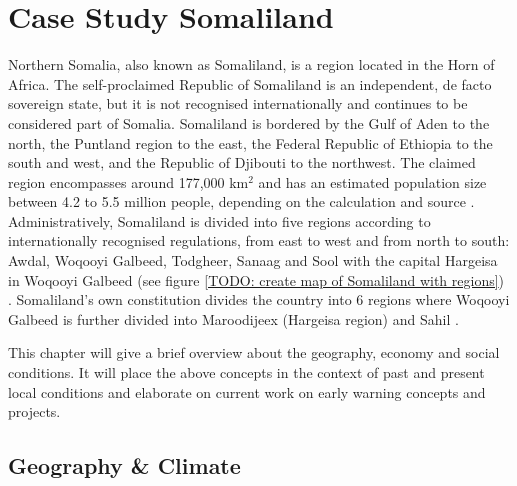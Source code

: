 

\section{Case Study Somaliland}\label{sec:case_area} 

Northern Somalia, also known as Somaliland, is a region located in the Horn of Africa. The self-proclaimed Republic of Somaliland is an independent, de facto sovereign state, but it is not recognised internationally and continues to be considered part of Somalia. Somaliland is bordered by the Gulf of Aden to the north, the Puntland region to the east, the Federal Republic of Ethiopia to the south and west, and the Republic of Djibouti to the northwest. The claimed region encompasses around 177,000 km$^2$ and has an estimated population size between 4.2 to 5.5 million people, depending on the calculation and source \autocite{petrucciLandscapeLandformsNorthern2022,republicofsomaliaRepublicSomalilandCountry2021,scrsFeasibilityStudyPotential2022}. Administratively, Somaliland is divided into five regions according to internationally recognised regulations, from east to west and from north to south: Awdal, Woqooyi Galbeed, Todgheer, Sanaag and Sool with the capital Hargeisa in Woqooyi Galbeed (see figure \ref{TODO: create map of Somaliland with regions}) \autocite{republicofsomaliaRepublicSomalilandCountry2021}. Somaliland's own constitution divides the country into 6 regions where Woqooyi Galbeed is further divided into Maroodijeex (Hargeisa region) and Sahil \autocite{republicofsomalilandRegionsDistrictsSelfmanagement2019}.


This chapter will give a brief overview about the geography, economy and social conditions. It will place the above concepts in the context of past and present local conditions and elaborate on current work on early warning concepts and projects. 


\subsection{Geography \& Climate}

